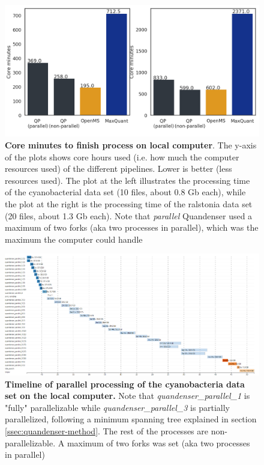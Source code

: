 \begin{figure}[H]
  \includegraphics[width=\linewidth]{results/times_core.png}
  \caption{\textbf{Core minutes to finish process on local computer}. The y-axis of the plots shows core hours used (i.e. how much the computer resources used) of the different pipelines. Lower is better (less resources used). The plot at the left illustrates the processing time of the cyanobacterial data set (10 files, about 0.8 Gb each), while the plot at the right is the processing time of the ralstonia data set (20 files, about 1.3 Gb each). Note that \textit{parallel} Quandenser used a maximum of two forks (aka two processes in parallel), which was the maximum the computer could handle}
  \label{fig:processing-local-cores}
\end{figure}


\begin{figure}[H]
  \includegraphics[width=\linewidth]{results/timeline-local.png}
  \caption{\textbf{Timeline of parallel processing of the cyanobacteria data set on the local computer.} Note that \textit{quandenser\_parallel\_1} is "fully" parallelizable while \textit{quandenser\_parallel\_3} is partially parallelized, following a minimum spanning tree explained in section \ref{ssec:quandenser-method}. The rest of the processes are non-parallelizable. A maximum of two forks was set (aka two processes in parallel)}
  \label{fig:timeline-local}
\end{figure}

